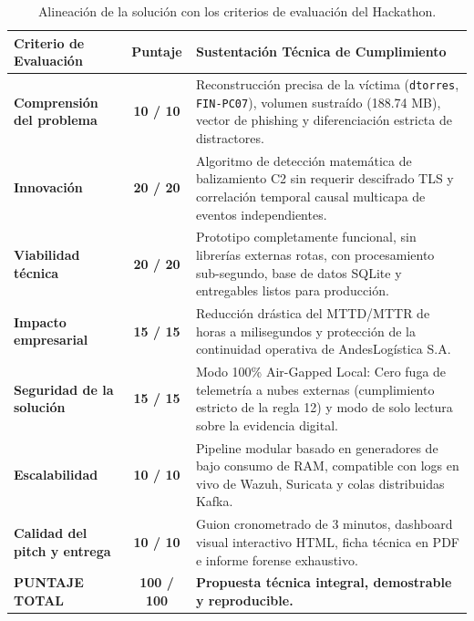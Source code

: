 \documentclass[11pt,a4paper]{article}
\begin{document}
\begin{table}[h!]
\centering
\small
\begin{tabularx}{\textwidth}{p{4.2cm} c p{8.5cm}}
\toprule
\textbf{Criterio de Evaluación} & \textbf{Puntaje} & \textbf{Sustentación Técnica de Cumplimiento} \\
\midrule
\textbf{Comprensión del problema} & \textbf{10 / 10} & Reconstrucción precisa de la víctima (\texttt{dtorres}, \texttt{FIN-PC07}), volumen sustraído (188.74 MB), vector de phishing y diferenciación estricta de distractores. \\
\midrule
\textbf{Innovación} & \textbf{20 / 20} & Algoritmo de detección matemática de balizamiento C2 sin requerir descifrado TLS y correlación temporal causal multicapa de eventos independientes. \\
\midrule
\textbf{Viabilidad técnica} & \textbf{20 / 20} & Prototipo completamente funcional, sin librerías externas rotas, con procesamiento sub-segundo, base de datos SQLite y entregables listos para producción. \\
\midrule
\textbf{Impacto empresarial} & \textbf{15 / 15} & Reducción drástica del MTTD/MTTR de horas a milisegundos y protección de la continuidad operativa de AndesLogística S.A. \\
\midrule
\textbf{Seguridad de la solución} & \textbf{15 / 15} & Modo 100\% Air-Gapped Local: Cero fuga de telemetría a nubes externas (cumplimiento estricto de la regla 12) y modo de solo lectura sobre la evidencia digital. \\
\midrule
\textbf{Escalabilidad} & \textbf{10 / 10} & Pipeline modular basado en generadores de bajo consumo de RAM, compatible con logs en vivo de Wazuh, Suricata y colas distribuidas Kafka. \\
\midrule
\textbf{Calidad del pitch y entrega} & \textbf{10 / 10} & Guion cronometrado de 3 minutos, dashboard visual interactivo HTML, ficha técnica en PDF e informe forense exhaustivo. \\
\midrule
\textbf{PUNTAJE TOTAL} & \textbf{100 / 100} & \textbf{Propuesta técnica integral, demostrable y reproducible.} \\
\bottomrule
\end{tabularx}
\caption{Alineación de la solución con los criterios de evaluación del Hackathon.}
\end{table}

\end{document}
